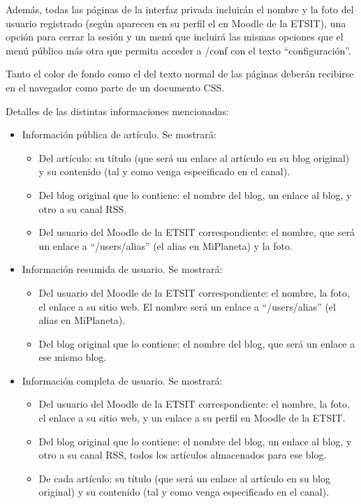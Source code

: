 Además, todas las páginas de la interfaz privada incluirán el nombre y la foto del usuario registrado (según aparecen en su perfil el en Moodle de la ETSIT), una opción para cerrar la sesión y un menú que incluirá las mismas opciones que el menú público más otra que permita acceder a /conf con el texto ``configuración''.

Tanto el color de fondo como el del texto normal de las páginas deberán recibirse en el navegador como parte de un documento CSS.

Detalles de las distintas informaciones mencionadas:

\begin{itemize}
\item Información pública de artículo. Se mostrará:
  \begin{itemize}
  \item Del artículo: su título (que será un enlace al artículo en su blog original) y su contenido (tal y como venga especificado en el canal).
  \item Del blog original que lo contiene: el nombre del blog, un enlace al blog, y otro a su canal RSS.
  \item Del usuario del Moodle de la ETSIT correspondiente: el nombre, que será un enlace a ``/users/alias'' (el alias en MiPlaneta) y la foto.
  \end{itemize}

\item Información resumida de usuario. Se mostrará:
  \begin{itemize}
  \item Del usuario del Moodle de la ETSIT correspondiente: el nombre, la foto, el enlace a su sitio web. El nombre será un enlace a ``/users/alias'' (el alias en MiPlaneta).
  \item Del blog original que lo contiene: el nombre del blog, que será un enlace a ese mismo blog.
  \end{itemize}

\item Información completa de usuario. Se mostrará:
  \begin{itemize}
  \item Del usuario del Moodle de la ETSIT correspondiente: el nombre, la foto, el enlace a su sitio web, y un enlace a su perfil en Moodle de la ETSIT.
  \item Del blog original que lo contiene: el nombre del blog, un enlace al blog, y otro a su canal RSS, todos los artículos almacenados para ese blog.
  \item De cada artículo: su título (que será un enlace al artículo en su blog original) y su contenido (tal y como venga especificado en el canal).
  \end{itemize}
\end{itemize}


